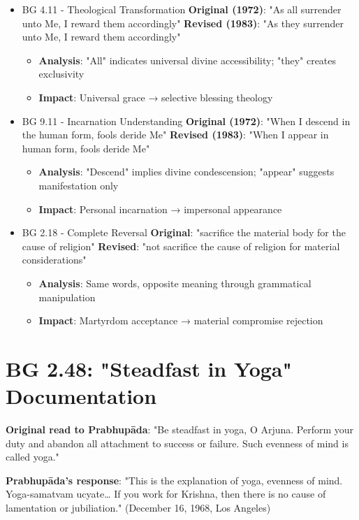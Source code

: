 \documentclass[11pt,twoside]{book}
\begin{document}
\begin{itemize}
\item BG 4.11 - Theological Transformation
\label{sec:org135c16e}
\textbf{\textbf{Original (1972)}}: "As all surrender unto Me, I reward them accordingly"
\textbf{\textbf{Revised (1983)}}: "As they surrender unto Me, I reward them accordingly"
\begin{itemize}
\item \textbf{\textbf{Analysis}}: "All" indicates universal divine accessibility; "they" creates exclusivity
\item \textbf{\textbf{Impact}}: Universal grace → selective blessing theology
\end{itemize}
\item BG 9.11 - Incarnation Understanding
\label{sec:orgf4f6d8b}
\textbf{\textbf{Original (1972)}}: "When I descend in the human form, fools deride Me"
\textbf{\textbf{Revised (1983)}}: "When I appear in human form, fools deride Me"
\begin{itemize}
\item \textbf{\textbf{Analysis}}: "Descend" implies divine condescension; "appear" suggests manifestation only
\item \textbf{\textbf{Impact}}: Personal incarnation → impersonal appearance
\end{itemize}
\item BG 2.18 - Complete Reversal
\label{sec:org9fe5432}
\textbf{\textbf{Original}}: "sacrifice the material body for the cause of religion" 
\textbf{\textbf{Revised}}: "not sacrifice the cause of religion for material considerations"
\begin{itemize}
\item \textbf{\textbf{Analysis}}: Same words, opposite meaning through grammatical manipulation
\item \textbf{\textbf{Impact}}: Martyrdom acceptance → material compromise rejection
\end{itemize}
\end{itemize}
\section*{BG 2.48: "Steadfast in Yoga" Documentation}
\label{sec:orgc7697d7}
\textbf{\textbf{Original read to Prabhupāda}}: "Be steadfast in yoga, O Arjuna. Perform your duty and abandon all attachment to success or failure. Such evenness of mind is called yoga."

\textbf{\textbf{Prabhupāda's response}}: "This is the explanation of yoga, evenness of mind. Yoga-samatvam ucyate\ldots{} If you work for Krishna, then there is no cause of lamentation or jubiliation." (December 16, 1968, Los Angeles)
\end{document}
